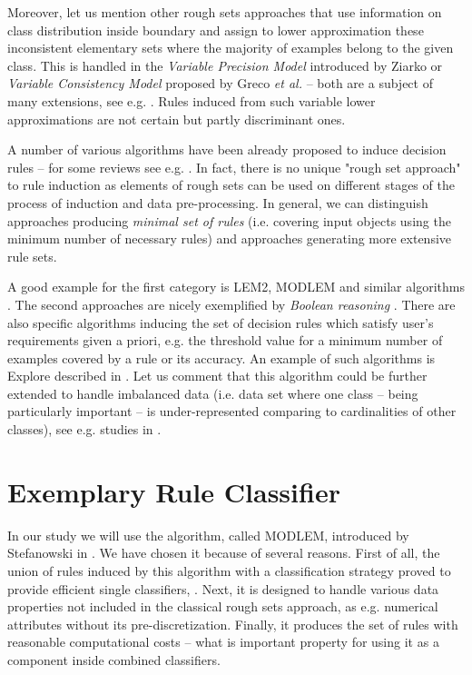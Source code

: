 \documentclass{llncs}
\begin{document}
Moreover, let us mention other rough sets approaches that use information on
class distribution inside boundary and assign to lower approximation these
inconsistent elementary sets where the majority of examples belong to the
given class. This is handled in the {\em Variable Precision Model}
introduced by Ziarko \cite{ziarko93} or {\em Variable Consistency Model}
proposed by Greco {\em et al.} \cite{GMSS} -- both are a subject of many
extensions, see e.g. \cite{slowinski}. Rules induced from such variable
lower approximations are not certain but partly discriminant ones.

A number of various algorithms have been already proposed to induce decision
rules  -- for some reviews see e.g.
\cite{bazan,lers,GrzymStef,tutorial,skowron93,Stef98,habcia}. In fact, there
is no unique "rough set approach" to rule induction as elements of rough
sets can be used on different stages of the process of induction and data
pre-processing. In general, we can distinguish approaches producing {\em
minimal set of rules} (i.e. covering input objects using the minimum number
of necessary rules) and approaches generating more extensive rule sets.

A good example for the first category is LEM2, MODLEM and similar algorithms
\cite{lers,modlem}. The second approaches are nicely exemplified by {\em
Boolean reasoning} \cite{skowron93,skowronrauszer,bazan}. There are also
specific algorithms inducing the set of decision rules which satisfy  user's
requirements given a priori, e.g. the threshold value for a  minimum number
of examples covered by a rule or its accuracy. An example of such algorithms
is Explore described in \cite{st2}. Let us comment that this algorithm could
be further extended to handle imbalanced data (i.e. data set where one class
-- being particularly important -- is under-represented comparing to
cardinalities of other classes), see e.g. studies in \cite{GrzymJSW,st3}.



\section{Exemplary Rule Classifier}


In our study we will use the algorithm, called MODLEM, introduced by
Stefanowski in \cite{modlem}. We have chosen it because of several reasons.
First of all, the union of rules induced by this algorithm with a
classification strategy proved to provide efficient single classifiers,
\cite{GrzymStef,nowaczyk,habcia}. Next, it is designed to handle various
data properties not included in the classical rough sets approach, as e.g.
numerical attributes without its pre-discretization. Finally, it produces
the set of rules with reasonable computational costs -- what is important
property for using it as a component inside combined classifiers.
\end{document}
